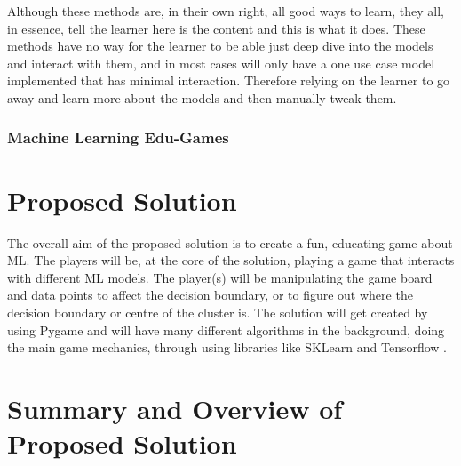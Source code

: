 		Although these methods are, in their own right, all good ways to learn, they all, in essence, tell the learner here is the content and this is what it does. These methods have no way for the learner to be able just deep dive into the models and interact with them, and in most cases will only have a one use case model implemented that has minimal interaction. Therefore relying on the learner to go away and learn more about the models and then manually tweak them.
		
	
	\subsubsection{Machine Learning Edu-Games}
		\label{sub_sec:ml_edu_games}
	
	\section{Proposed Solution}
	The overall aim of the proposed solution is to create a fun, educating game about ML. The players will be, at the core of the solution, playing a game that interacts with different ML models. The player(s) will be manipulating the game board and data points to affect the decision boundary, or to figure out where the decision boundary or centre of the cluster is. The solution will get created by using  Pygame and will have many different algorithms in the background, doing the main game mechanics, through using libraries like SKLearn \cite{sklearn_api} and Tensorflow \cite{tensorflow2015-whitepaper}.
	
	\section{Summary and Overview of Proposed Solution}
	